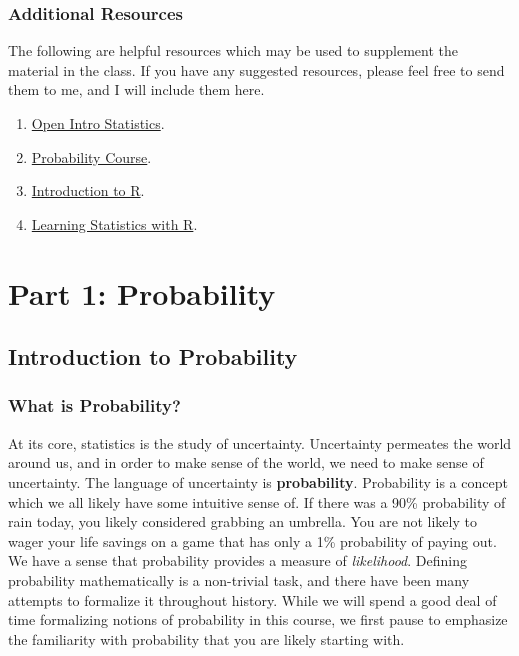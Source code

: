 \documentclass[
  letterpaper,
  DIV=11,
  numbers=noendperiod]{scrreprt}
\providecommand{\tightlist}{%
  \setlength{\itemsep}{0pt}\setlength{\parskip}{0pt}}\usepackage{longtable,booktabs,array}
\theoremstyle{definition}
\theoremstyle{definition}
\theoremstyle{definition}
\theoremstyle{remark}
\begin{document}
\section*{Additional Resources}\label{additional-resources}


The following are helpful resources which may be used to supplement the
material in the class. If you have any suggested resources, please feel
free to send them to me, and I will include them here.

\begin{enumerate}
\def\labelenumi{\arabic{enumi}.}
\tightlist
\item
  \href{https://www.openintro.org/book/os/}{Open Intro Statistics}.
\item
  \href{https://www.probabilitycourse.com/}{Probability Course}.
\item
  \href{https://bookdown.org/f_lennert/introduction-to-r/}{Introduction
  to R}.
\item
  \href{https://learningstatisticswithr.com/}{Learning Statistics with
  R}.
\end{enumerate}

\part{Part 1: Probability}

\chapter{Introduction to Probability}\label{introduction-to-probability}

\section{What is Probability?}\label{what-is-probability}

At its core, statistics is the study of uncertainty. Uncertainty
permeates the world around us, and in order to make sense of the world,
we need to make sense of uncertainty. The language of uncertainty is
\textbf{probability}. Probability is a concept which we all likely have
some intuitive sense of. If there was a 90\% probability of rain today,
you likely considered grabbing an umbrella. You are not likely to wager
your life savings on a game that has only a 1\% probability of paying
out. We have a sense that probability provides a measure of
\emph{likelihood}. Defining probability mathematically is a non-trivial
task, and there have been many attempts to formalize it throughout
history. While we will spend a good deal of time formalizing notions of
probability in this course, we first pause to emphasize the familiarity
with probability that you are likely starting with.
\end{document}
